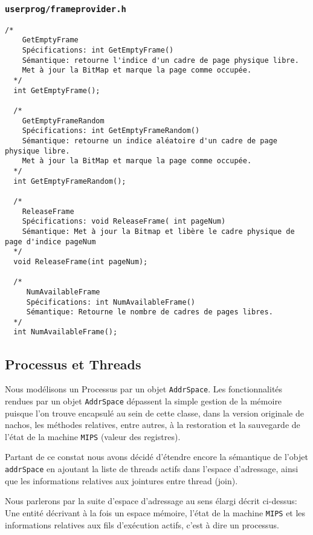 \documentclass[11pt]{article}
\begin{document}
\subsubsection{\texttt{userprog/frameprovider.h}}
\begin{lstlisting}[columns=fixed,basicstyle=\scriptsize\ttfamily]
/*
    GetEmptyFrame
    Spécifications: int GetEmptyFrame()
    Sémantique: retourne l'indice d'un cadre de page physique libre.
    Met à jour la BitMap et marque la page comme occupée.
  */
  int GetEmptyFrame();

  /*
    GetEmptyFrameRandom
    Spécifications: int GetEmptyFrameRandom()
    Sémantique: retourne un indice aléatoire d'un cadre de page physique libre.
    Met à jour la BitMap et marque la page comme occupée.
  */
  int GetEmptyFrameRandom();

  /*
    ReleaseFrame
    Spécifications: void ReleaseFrame( int pageNum)
    Sémantique: Met à jour la Bitmap et libère le cadre physique de page d'indice pageNum
  */
  void ReleaseFrame(int pageNum);

  /*
     NumAvailableFrame
     Spécifications: int NumAvailableFrame()
     Sémantique: Retourne le nombre de cadres de pages libres.
  */
  int NumAvailableFrame();
\end{lstlisting}
\subsubsection{}

\subsection{Processus et Threads}
Nous modélisons un Processus par un objet \texttt{AddrSpace}.
Les fonctionnalités rendues par un objet \texttt{AddrSpace} dépassent la simple gestion de la mémoire puisque l'on trouve encapsulé au sein de cette classe, dans la version originale de nachos, les méthodes relatives, entre autres, à la restoration et la sauvegarde de l'état de la machine \texttt{MIPS} (valeur des registres).

Partant de ce constat nous avons décidé d'étendre encore la sémantique de l'objet \texttt{addrSpace} en ajoutant la liste de threads actifs dans l'espace d'adressage, ainsi que les informations relatives aux jointures entre thread (join).

Nous parlerons par la suite d'espace d'adressage au sens élargi décrit ci-dessus:
Une entité décrivant à la fois un espace mémoire, l'état de la machine \texttt{MIPS} et les informations relatives aux fils d'exécution actifs, c'est à dire un processus.
\end{document}
